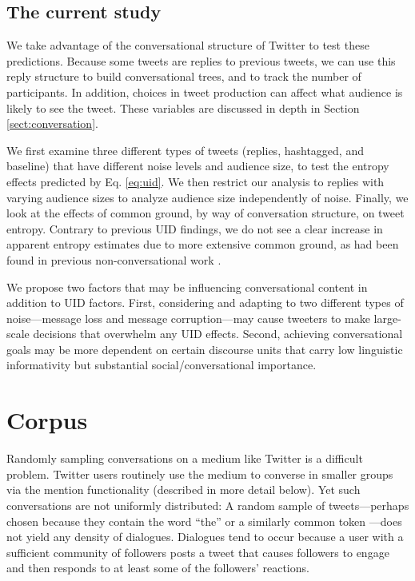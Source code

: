 \documentclass[11pt,letterpaper]{article}
\begin{document}
\subsection{The current study}

We take advantage of the conversational structure of Twitter to test these predictions.  Because some tweets are replies to previous tweets, we can use this reply structure to build conversational trees, and to track the number of participants.  In addition, choices in tweet production can affect what audience is likely to see the tweet.  These variables are discussed in depth in Section \ref{sect:conversation}.

We first examine three different types of tweets (replies, hashtagged, and baseline) that have different noise levels and audience size, to test the entropy effects predicted by Eq. \ref{eq:uid}.  We then restrict our analysis to replies with varying audience sizes to analyze audience size independently of noise.  Finally, we look at the effects of common ground, by way of conversation structure, on tweet entropy. Contrary to previous UID findings, we do not see a clear increase in apparent entropy estimates due to more extensive common ground, as had been found in previous non-conversational work \cite{genzel2002,qian2012,doyle2015}.  

We propose two factors that may be influencing conversational content in addition to UID factors.  First, considering and adapting to two different types of noise---message loss and message corruption---may cause tweeters to make large-scale decisions that overwhelm any UID effects.  Second, achieving conversational goals may be more dependent on certain discourse units that carry low linguistic informativity but substantial social/conversational importance.

\section{Corpus}

Randomly sampling conversations on a medium like Twitter is a difficult problem. Twitter users routinely use the medium to converse in smaller groups via the \@ mention functionality (described in more detail below). Yet such conversations are not uniformly distributed: A random sample of tweets---perhaps chosen because they contain the word ``the'' or a similarly common token \cite{doyle2014}---does not yield any density of dialogues. Dialogues tend to occur because a user with a sufficient community of followers posts a tweet that causes followers to engage and then responds to at least some of the followers' reactions. 
\end{document}
